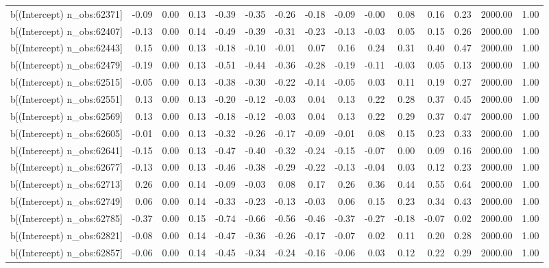 \begin{table}[ht]
\begin{tabular}{rrrrrrrrrrrrrrr}
  b[(Intercept) n\_obs:62371] & -0.09 & 0.00 & 0.13 & -0.39 & -0.35 & -0.26 & -0.18 & -0.09 & -0.00 & 0.08 & 0.16 & 0.23 & 2000.00 & 1.00 \\ 
  b[(Intercept) n\_obs:62407] & -0.13 & 0.00 & 0.14 & -0.49 & -0.39 & -0.31 & -0.23 & -0.13 & -0.03 & 0.05 & 0.15 & 0.26 & 2000.00 & 1.00 \\ 
  b[(Intercept) n\_obs:62443] & 0.15 & 0.00 & 0.13 & -0.18 & -0.10 & -0.01 & 0.07 & 0.16 & 0.24 & 0.31 & 0.40 & 0.47 & 2000.00 & 1.00 \\ 
  b[(Intercept) n\_obs:62479] & -0.19 & 0.00 & 0.13 & -0.51 & -0.44 & -0.36 & -0.28 & -0.19 & -0.11 & -0.03 & 0.05 & 0.13 & 2000.00 & 1.00 \\ 
  b[(Intercept) n\_obs:62515] & -0.05 & 0.00 & 0.13 & -0.38 & -0.30 & -0.22 & -0.14 & -0.05 & 0.03 & 0.11 & 0.19 & 0.27 & 2000.00 & 1.00 \\ 
  b[(Intercept) n\_obs:62551] & 0.13 & 0.00 & 0.13 & -0.20 & -0.12 & -0.03 & 0.04 & 0.13 & 0.22 & 0.28 & 0.37 & 0.45 & 2000.00 & 1.00 \\ 
  b[(Intercept) n\_obs:62569] & 0.13 & 0.00 & 0.13 & -0.18 & -0.12 & -0.03 & 0.04 & 0.13 & 0.22 & 0.29 & 0.37 & 0.47 & 2000.00 & 1.00 \\ 
  b[(Intercept) n\_obs:62605] & -0.01 & 0.00 & 0.13 & -0.32 & -0.26 & -0.17 & -0.09 & -0.01 & 0.08 & 0.15 & 0.23 & 0.33 & 2000.00 & 1.00 \\ 
  b[(Intercept) n\_obs:62641] & -0.15 & 0.00 & 0.13 & -0.47 & -0.40 & -0.32 & -0.24 & -0.15 & -0.07 & 0.00 & 0.09 & 0.16 & 2000.00 & 1.00 \\ 
  b[(Intercept) n\_obs:62677] & -0.13 & 0.00 & 0.13 & -0.46 & -0.38 & -0.29 & -0.22 & -0.13 & -0.04 & 0.03 & 0.12 & 0.23 & 2000.00 & 1.00 \\ 
  b[(Intercept) n\_obs:62713] & 0.26 & 0.00 & 0.14 & -0.09 & -0.03 & 0.08 & 0.17 & 0.26 & 0.36 & 0.44 & 0.55 & 0.64 & 2000.00 & 1.00 \\ 
  b[(Intercept) n\_obs:62749] & 0.06 & 0.00 & 0.14 & -0.33 & -0.23 & -0.13 & -0.03 & 0.06 & 0.15 & 0.23 & 0.34 & 0.43 & 2000.00 & 1.00 \\ 
  b[(Intercept) n\_obs:62785] & -0.37 & 0.00 & 0.15 & -0.74 & -0.66 & -0.56 & -0.46 & -0.37 & -0.27 & -0.18 & -0.07 & 0.02 & 2000.00 & 1.00 \\ 
  b[(Intercept) n\_obs:62821] & -0.08 & 0.00 & 0.14 & -0.47 & -0.36 & -0.26 & -0.17 & -0.07 & 0.02 & 0.11 & 0.20 & 0.28 & 2000.00 & 1.00 \\ 
  b[(Intercept) n\_obs:62857] & -0.06 & 0.00 & 0.14 & -0.45 & -0.34 & -0.24 & -0.16 & -0.06 & 0.03 & 0.12 & 0.22 & 0.29 & 2000.00 & 1.00 \\ 

\end{tabular}
\end{table}
